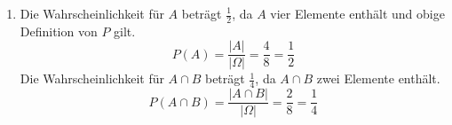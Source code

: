 \documentclass[a4paper]{scrartcl}
\begin{document}
\begin{enumerate}[label=\bfseries\arabic*.]
\begin{enumerate}[label=(\alph*)]
            \item
                Die Wahrscheinlichkeit für $A$ beträgt $\frac{1}{2}$, da $A$
                vier Elemente enthält und obige Definition von $P$ gilt.
                \begin{equation}
                    P(A) = \frac{|A|}{|\Omega|} = \frac{4}{8} = \frac{1}{2}
                \end{equation}
                Die Wahrscheinlichkeit für $A \cap B$ beträgt $\frac{1}{4}$,
                da $A \cap B$ zwei Elemente enthält.
                \begin{equation}
                    P(A \cap B) = \frac{|A \cap B|}{|\Omega|}
                    = \frac{2}{8} = \frac{1}{4}
                \end{equation}

        \end{enumerate}

\end{enumerate}
\end{document}

